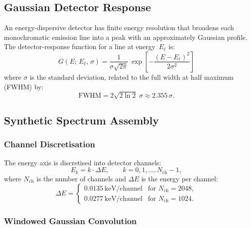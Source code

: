 \documentclass[journal,lettersize]{IEEEtran}
\begin{document}
\subsection{Gaussian Detector Response}\label{sec:gaussian}

An energy-dispersive detector has finite energy resolution that broadens
each monochromatic emission line into a peak with an approximately
Gaussian profile.  The detector-response function for a line at
energy~$E_\ell$ is:
\begin{equation}\label{eq:gaussian}
  \boxed{
    G(E;\,E_\ell,\,\sigma) =
      \frac{1}{\sigma\sqrt{2\pi}}\,
      \exp\!\left[-\frac{(E - E_\ell)^2}{2\sigma^2}\right]
  }
\end{equation}
where $\sigma$ is the standard deviation, related to the full width at
half maximum (FWHM) by:
\begin{equation}\label{eq:fwhm}
  \mathrm{FWHM} = 2\sqrt{2\ln 2}\;\sigma \approx 2.355\,\sigma.
\end{equation}

\subsection{Synthetic Spectrum Assembly}\label{sec:spectrum}

\subsubsection{Channel Discretisation}

The energy axis is discretised into detector channels:
\begin{equation}\label{eq:channel_energy}
  E_k = k \cdot \Delta E, \qquad k = 0, 1, \dots, N_{\mathrm{ch}}-1,
\end{equation}
where $N_{\mathrm{ch}}$ is the number of channels and $\Delta E$ is the
energy per channel:
\begin{equation}\label{eq:energy_factor}
  \Delta E =
  \begin{cases}
    0.0135~\text{keV/channel} & \text{for } N_{\mathrm{ch}} = 2048,\\[3pt]
    0.0277~\text{keV/channel} & \text{for } N_{\mathrm{ch}} = 1024.
  \end{cases}
\end{equation}

\subsubsection{Windowed Gaussian Convolution}
\end{document}
